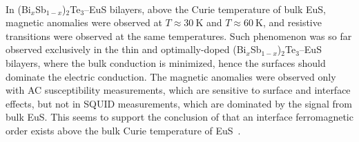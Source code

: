 \paragraph{}
In (Bi$_x$Sb$_{1-x}$)$_2$Te$_3$--EuS bilayers, above the Curie temperature of bulk EuS, magnetic anomalies were observed at $T\approx30~\mathrm{K}$ and $T\approx60~\mathrm{K}$, and resistive transitions were observed at the same temperatures. Such phenomenon was so far observed exclusively in the thin and optimally-doped (Bi$_x$Sb$_{1-x}$)$_2$Te$_3$--EuS bilayers, where the bulk conduction is minimized, hence the surfaces should dominate the electric conduction. The magnetic anomalies were observed only with AC susceptibility measurements, which are sensitive to surface and interface effects, but not in SQUID measurements, which are dominated by the signal from bulk EuS. This seems to support the conclusion of \citeauthor{Moodera2016} that an interface ferromagnetic order exists above the bulk Curie temperature of EuS~\cite{Moodera2016}.